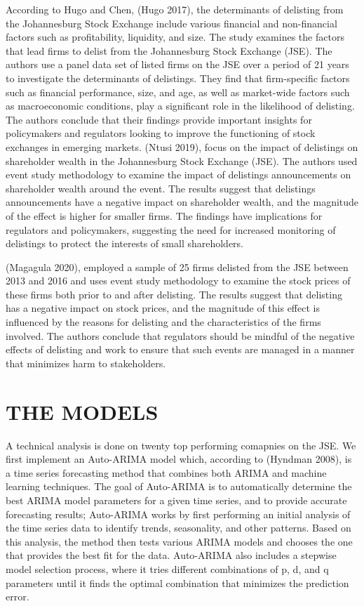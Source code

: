 \documentclass[
]{article}
\begin{document}
According to Hugo and Chen, (Hugo 2017), the determinants of delisting
from the Johannesburg Stock Exchange include various financial and
non-financial factors such as profitability, liquidity, and size. The
study examines the factors that lead firms to delist from the
Johannesburg Stock Exchange (JSE). The authors use a panel data set of
listed firms on the JSE over a period of 21 years to investigate the
determinants of delistings. They find that firm-specific factors such as
financial performance, size, and age, as well as market-wide factors
such as macroeconomic conditions, play a significant role in the
likelihood of delisting. The authors conclude that their findings
provide important insights for policymakers and regulators looking to
improve the functioning of stock exchanges in emerging markets. (Ntusi
2019), focus on the impact of delistings on shareholder wealth in the
Johannesburg Stock Exchange (JSE). The authors used event study
methodology to examine the impact of delistings announcements on
shareholder wealth around the event. The results suggest that delistings
announcements have a negative impact on shareholder wealth, and the
magnitude of the effect is higher for smaller firms. The findings have
implications for regulators and policymakers, suggesting the need for
increased monitoring of delistings to protect the interests of small
shareholders.

(Magagula 2020), employed a sample of 25 firms delisted from the JSE
between 2013 and 2016 and uses event study methodology to examine the
stock prices of these firms both prior to and after delisting. The
results suggest that delisting has a negative impact on stock prices,
and the magnitude of this effect is influenced by the reasons for
delisting and the characteristics of the firms involved. The authors
conclude that regulators should be mindful of the negative effects of
delisting and work to ensure that such events are managed in a manner
that minimizes harm to stakeholders.

\hypertarget{the-models}{%
\section{THE MODELS}\label{the-models}}

A technical analysis is done on twenty top performing comapnies on the
JSE. We first implement an Auto-ARIMA model which, according to (Hyndman
2008), is a time series forecasting method that combines both ARIMA and
machine learning techniques. The goal of Auto-ARIMA is to automatically
determine the best ARIMA model parameters for a given time series, and
to provide accurate forecasting results; Auto-ARIMA works by first
performing an initial analysis of the time series data to identify
trends, seasonality, and other patterns. Based on this analysis, the
method then tests various ARIMA models and chooses the one that provides
the best fit for the data. Auto-ARIMA also includes a stepwise model
selection process, where it tries different combinations of p, d, and q
parameters until it finds the optimal combination that minimizes the
prediction error.
\end{document}
